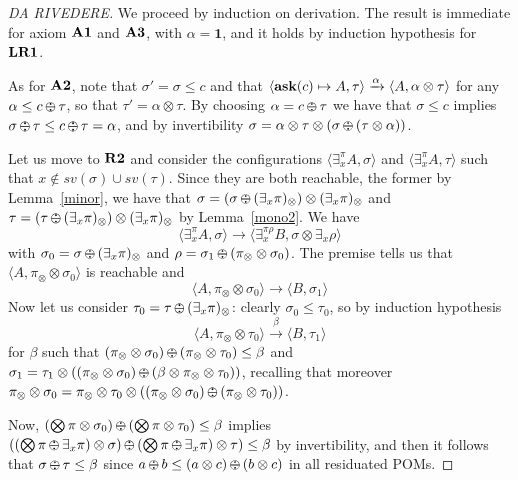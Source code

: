 \documentclass{llncs}
\newcommand{\ask}{{\bf ask}}
\def\monid{{\mathbf 0}}
\def\odiv{\, {\ominus\hspace{-7.7pt} \div} \,}
\def\monid{\mathbf{1}}
\begin{document}
\begin{proof}
[DA RIVEDERE]
We proceed by induction on derivation.
The result is immediate for axiom ${\bf A1}$ and ${\bf A3}$, with 
$\alpha = \monid$, and it holds by induction hypothesis for 
${\bf LR1}$.

As for ${\bf A2}$, note that $\sigma' = \sigma \leq c$ and that 
$\langle \hbox{\ask}(c) \mapsto A, \tau \rangle \xrightarrow{\alpha} \langle A, \alpha \otimes \tau \rangle$ 
for any $\alpha \leq c\odiv \tau$, so that $\tau' = \alpha \otimes \tau$.
%
By choosing $\alpha = c \odiv \tau$ we have that $\sigma \leq c$
implies $\sigma \odiv \tau \leq c \odiv \tau = \alpha$,
and 
by invertibility 
$\sigma = \alpha \otimes \tau \otimes  (\sigma \odiv (\tau \otimes \alpha))$.

Let us  move to ${\bf R2}$ and consider the configurations 
$\langle \exists^\pi_x A, \sigma \rangle$  and
$\langle \exists^\pi_x A, \tau \rangle$
such that $x \not \in sv(\sigma) \cup sv(\tau)$. 
Since they are both reachable, the former by Lemma~\ref{minor}, we have that 
$\sigma = (\sigma \odiv (\exists_x \pi)_\otimes) \otimes (\exists_x \pi)_\otimes$ and
$\tau = (\tau \odiv (\exists_x \pi)_\otimes) \otimes (\exists_x \pi)_\otimes$
by Lemma~\ref{mono2}.
%
We have 
$$\langle \exists^\pi_x A, \sigma \rangle \to
  \langle \exists^{\pi \rho}_x B, \sigma \otimes \exists_x \rho \rangle$$
  with $\sigma_0 = \sigma \odiv (\exists_x \pi)_\otimes$ and $\rho = \sigma_1 \odiv (\pi_\otimes  \otimes \sigma_0)$.
The premise tells us that $\langle A, \pi_\otimes \otimes \sigma_0 \rangle$ is reachable and
$$\langle A, \pi_\otimes \otimes \sigma_0 \rangle \to
  \langle B, \sigma_1 \rangle$$
%
Now let us consider $\tau_0 = \tau \odiv (\exists_x \pi)_\otimes$: clearly $\sigma_0 \leq \tau_0$,
so by induction hypothesis
$$\langle A, \pi_\otimes \otimes \tau_0 \rangle  \xrightarrow{\beta}
  \langle B, \tau_1 \rangle$$  for $\beta$ such that 
  $(\pi_\otimes \otimes \sigma_0) \odiv (\pi_\otimes \otimes \tau_0) \leq \beta$
  and $\sigma_1 = \tau_1 \otimes ((\pi_\otimes \otimes \sigma_0) \odiv (\beta \otimes \pi_\otimes \otimes \tau_0))$,
  recalling that moreover
  $\pi_\otimes \otimes \sigma_0 = \pi_\otimes \otimes \tau_0 \otimes ((\pi_\otimes \otimes \sigma_0) \odiv (\pi_\otimes \otimes \tau_0))$.


%
Now, $(\bigotimes \pi \otimes \sigma_0) \odiv (\bigotimes \pi \otimes \tau_0) \leq \beta$ implies 
$((\bigotimes \pi \odiv \exists_x \pi) \otimes \sigma) \odiv (\bigotimes \pi \odiv \exists_x \pi) \otimes \tau) \leq \beta$
by invertibility, and then it follows that $\sigma \odiv \tau \leq \beta$
since $a \odiv b \leq (a \otimes c) \odiv (b \otimes c)$ in all residuated POMs.


\end{proof}
\end{document}

